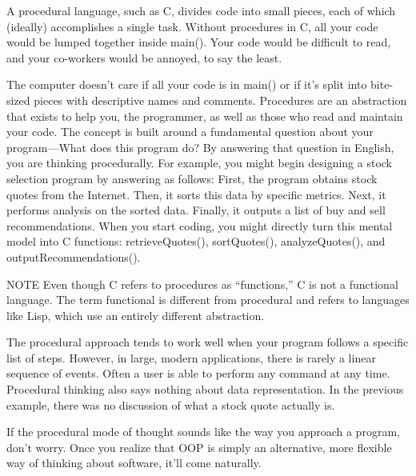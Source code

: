 A procedural language, such as C, divides code into small pieces, each of which (ideally) accomplishes a single task. Without procedures in C, all your code would be lumped together inside main(). Your code would be difficult to read, and your co-workers would be annoyed, to say the least.

The computer doesn’t care if all your code is in main() or if it’s split into bite-sized pieces with descriptive names and comments. Procedures are an abstraction that exists to help you, the programmer, as well as those who read and maintain your code. The concept is built around a fundamental question about your program—What does this program do? By answering that question in English, you are thinking procedurally. For example, you might begin designing a stock selection program by answering as follows: First, the program obtains stock quotes from the Internet. Then, it sorts this data by specific metrics. Next, it performs analysis on the sorted data. Finally, it outputs a list of buy and sell recommendations. When you start coding, you might directly turn this mental model into C functions: retrieveQuotes(), sortQuotes(), analyzeQuotes(), and outputRecommendations().


\begin{myNotic}{NOTE}
Even though C refers to procedures as “functions,” C is not a functional language. The term functional is different from procedural and refers to languages like Lisp, which use an entirely different abstraction.
\end{myNotic}


The procedural approach tends to work well when your program follows a specific list of steps. However, in large, modern applications, there is rarely a linear sequence of events. Often a user is able to perform any command at any time. Procedural thinking also says nothing about data representation. In the previous example, there was no discussion of what a stock quote actually is.

If the procedural mode of thought sounds like the way you approach a program, don’t worry. Once you realize that OOP is simply an alternative, more flexible way of thinking about software, it’ll come naturally.







